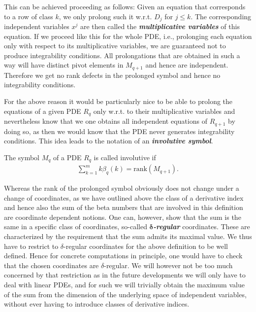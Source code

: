 This can be achieved proceeding as follows:
Given an equation that corresponds to a row of class $k$, we only prolong such it w.r.t. $D_j$ for  $j \leq k$. The corresponding independent variables $x^j$ are then called the \textbf{\textit{multiplicative variables}} of this equation. If we proceed like this for the whole PDE, i.e., prolonging each equation only with respect to its multiplicative variables, we are guaranteed not to produce integrability conditions. All prolongations that are obtained in such a way will have distinct pivot elements in $M_{q+1}$ and hence are independent. Therefore we get no rank defects in the prolonged symbol and hence no integrability conditions.

For the above reason it would be particularly nice to be able to prolong the equations of a given PDE $R_q$ only w.r.t. to their multiplicative variables and nevertheless know that we one obtains all independent equations of $R_{q+1}$ by doing so, as then we would know that the PDE never generates integrability conditions. This idea leads to the notation of an \textit{\textbf{involutive symbol}}. 
\begin{definition}
The symbol $M_q$ of a PDE $R_q$ is called involutive if 
\begin{align}\label{sumBeta}
    \sum_{k=1}^m k\beta_q(k) = \mathrm{rank}(M_{q+1}).
\end{align}
\end{definition}
\begin{remark}
Whereas the rank of the prolonged symbol obviously does not change under a change of coordinates,
as we have outlined above the class of a derivative index and hence also the sum of the beta numbers that are involved in this definition are coordinate dependent notions. One can, however, show that the sum is the same in a specific class of coordinates, so-called \textit{\textbf{$\boldsymbol{\delta}$-regular}} coordinates. These are characterized by the requirement that the sum admits its maximal value.
We thus have to restrict to $\delta$-regular coordinates for the above definition to be well defined.
Hence for concrete computations in principle, one would have to check that the chosen coordinates are $\delta$-regular.  We will however not be too much concerned by that restriction as in the future developments we will only have to deal with linear PDEs, and for such we will trivially obtain the maximum value of the sum from the dimension of the underlying space of independent variables, without ever having to introduce classes of derivative indices.
\end{remark}
